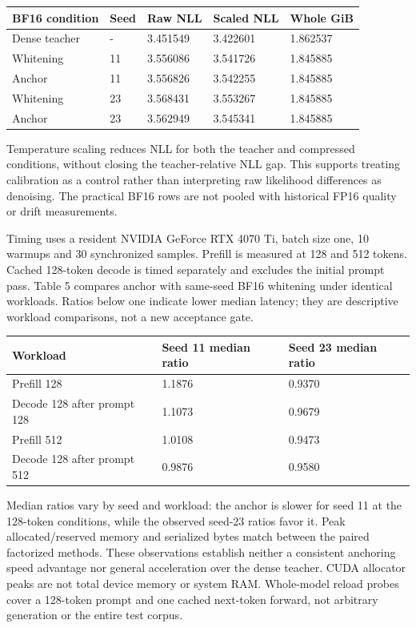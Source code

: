 \documentclass[10pt]{article}
\begin{document}
{\scriptsize\setlength{\tabcolsep}{2pt}
\begin{longtable}{p{}p{}p{}p{}p{}}
BF16 condition & Seed & Raw NLL & Scaled NLL & Whole GiB \\
\hline\endhead
Dense teacher & - & 3.451549 & 3.422601 & 1.862537 \\
Whitening & 11 & 3.556086 & 3.541726 & 1.845885 \\
Anchor & 11 & 3.556826 & 3.542255 & 1.845885 \\
Whitening & 23 & 3.568431 & 3.553267 & 1.845885 \\
Anchor & 23 & 3.562949 & 3.545341 & 1.845885 \\
\end{longtable}}

Temperature scaling reduces NLL for both the teacher and compressed conditions, without closing the teacher-relative NLL gap. This supports treating calibration as a control rather than interpreting raw likelihood differences as denoising. The practical BF16 rows are not pooled with historical FP16 quality or drift measurements.

Timing uses a resident NVIDIA GeForce RTX 4070 Ti, batch size one, 10 warmups and 30 synchronized samples. Prefill is measured at 128 and 512 tokens. Cached 128-token decode is timed separately and excludes the initial prompt pass. Table 5 compares anchor with same-seed BF16 whitening under identical workloads. Ratios below one indicate lower median latency; they are descriptive workload comparisons, not a new acceptance gate.

{\scriptsize\setlength{\tabcolsep}{2pt}
\begin{longtable}{p{}p{}p{}}
Workload & Seed 11 median ratio & Seed 23 median ratio \\
\hline\endhead
Prefill 128 & 1.1876 & 0.9370 \\
Decode 128 after prompt 128 & 1.1073 & 0.9679 \\
Prefill 512 & 1.0108 & 0.9473 \\
Decode 128 after prompt 512 & 0.9876 & 0.9580 \\
\end{longtable}}

Median ratios vary by seed and workload: the anchor is slower for seed 11 at the 128-token conditions, while the observed seed-23 ratios favor it. Peak allocated/reserved memory and serialized bytes match between the paired factorized methods. These observations establish neither a consistent anchoring speed advantage nor general acceleration over the dense teacher. CUDA allocator peaks are not total device memory or system RAM. Whole-model reload probes cover a 128-token prompt and one cached next-token forward, not arbitrary generation or the entire test corpus.
\end{document}
